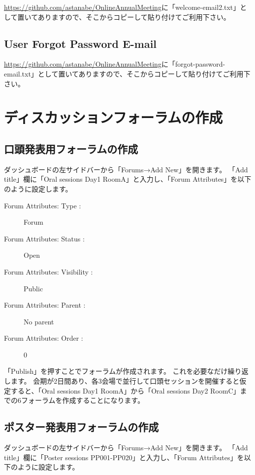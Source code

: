 \documentclass[titlepage,10pt,a4paper,uplatex]{jsbook}
\begin{document}
\url{https://github.com/astanabe/OnlineAnnualMeeting}に「welcome-email2.txt」として置いてありますので、そこからコピーして貼り付けてご利用下さい。

\subsection{User Forgot Password E-mail}

\url{https://github.com/astanabe/OnlineAnnualMeeting}に「forgot-password-email.txt」として置いてありますので、そこからコピーして貼り付けてご利用下さい。

\section{ディスカッションフォーラムの作成}

\subsection{口頭発表用フォーラムの作成}

ダッシュボードの左サイドバーから「Forums→Add New」を開きます。
「Add title」欄に「Oral sessions Day1 RoomA」と入力し、「Forum Attributes」を以下のように設定します。

\begin{description}
\item[Forum Attributes: Type : ] Forum
\item[Forum Attributes: Status : ] Open
\item[Forum Attributes: Visibility : ] Public
\item[Forum Attributes: Parent : ] No parent
\item[Forum Attributes: Order : ] 0
\end{description}

「Publish」を押すことでフォーラムが作成されます。
これを必要なだけ繰り返します。
会期が2日間あり、各3会場で並行して口頭セッションを開催すると仮定すると、「Oral sessions Day1 RoomA」から「Oral sessions Day2 RoomC」までの6フォーラムを作成することになります。

\subsection{ポスター発表用フォーラムの作成}

ダッシュボードの左サイドバーから「Forums→Add New」を開きます。
「Add title」欄に「Poster sessions PP001-PP020」と入力し、「Forum Attributes」を以下のように設定します。
\end{document}
